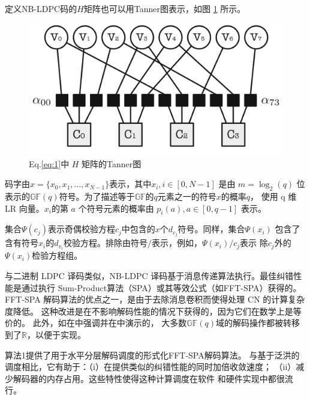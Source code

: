 \documentclass{cjc}
\begin{document}
  定义NB-LDPC码的$H$矩阵也可以用Tanner图表示，如图 \ref{fig:1} 所示。

\begin{figure}[htb]
  \centering
  \includegraphics[width=\linewidth]{assets/fig1.png}
  \caption{Eq.\ref{eq:1}中 $H$ 矩阵的Tanner图}\label{fig:1}
\end{figure}

  码字由$x=\{x_0,x_1,\dots,x_{N-1}\}$表示，其中$x_i,i\in[0,N-1]$ 是由 $m=\log_2(q)$
  位表示的$\mathbb{GF}(q)$符号。为了描述等于$\mathbb{GF}$的$q$元素之一的符号$x$的概率$q$，
  使用 q 维 LR 向量。$x_i$的第 $a$ 个符号元素的概率由 $p_i(a),a\in[0,q-1]$ 表示。

  集合$\Psi(c_j)$表示奇偶校验方程$c_j$中包含的$x$个$d_{c_j}$符号。同样，集合$\Psi(x_i)$
  包含了含有符号$x_i$的$d_{v_i}$校验方程。排除由符号$/$表示，例如，$\Psi(x_i)/c_j$表示
  除$c_j$外的$\Psi(x_i)$检验方程组。

  与二进制 LDPC 译码类似，NB-LDPC 译码基于消息传递算法执行。最佳纠错性能是通过执行
  Sum-Product算法\cite{carrasco_non-binary_2008}（SPA）或其等效公式（如FFT-SPA\cite{carrasco_non-binary_2008}）获得的。
  FFT-SPA 解码算法的优点之一，是由于去除消息卷积而使得处理 CN 的计算复杂度降低。
  这种改进是在不影响解码性能的情况下获得的，因为它们在数学上是等价的\cite{comparison_NBLDPC}。
  此外，如在\cite{noauthor_andrade_nodate}中强调并在\cite{carrasco_non-binary_2008}中演示的，
  大多数$\mathbb{GF}(q)$域的解码操作都被转移到了$\mathbb{R}$，以便于实现。

  算法1提供了用于水平分层解码调度的形式化FFT-SPA解码算法\cite{beermann_gpu_2015,liu_high-throughput_2018,noauthor_hocevar_nodate}。
  与基于泛洪的调度相比，它有助于：（i）在提供类似的纠错性能的同时加倍收敛速度；
  （ii）减少解码器的内存占用。这些特性使得这种计算调度在软件\cite{noauthor_thi_nodate,beermann_gpu_2015,noauthor_pham_nodate,liu_high-throughput_2018}
  和硬件\cite{boutillon_design_2013,abassi_novel_2017}实现中都很流行。
\end{document}
